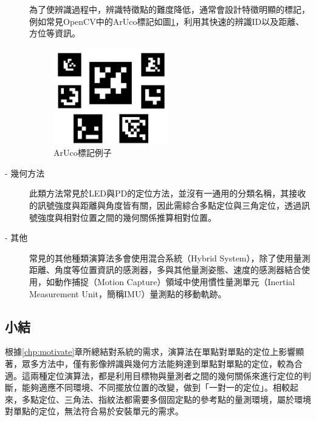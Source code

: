 \begin{description}
        \qquad
        為了使辨識過程中，辨識特徵點的難度降低，通常會設計特徵明顯的標記，例如常見OpenCV中的ArUco標記如圖\ref{pic:aruco}，利用其快速的辨識ID以及距離、方位等資訊。
        
        \begin{figure}[htpb]
            \centering
            \includegraphics[width=5cm]{ch2pic/aruco.png}
            \caption{ArUco標記例子\cite{pic:aruco}}
            \label{pic:aruco}
        \end{figure}
        
        \item[- 幾何方法] \hfill 
        
        \qquad
        此類方法常見於LED與PD的定位方法，並沒有一通用的分類名稱，其接收的訊號強度與距離與角度皆有關，因此需綜合多點定位與三角定位，透過訊號強度與相對位置之間的幾何關係推算相對位置\cite{survey_light2020}。
        
        \item[- 其他]\hfill 
        
        \qquad
        常見的其他種類演算法多會使用混合系統（Hybrid System）\cite{survey_indoor2018}，除了使用量測距離、角度等位置資訊的感測器，多與其他量測姿態、速度的感測器結合使用，如動作捕捉（Motion Capture）領域中使用慣性量測單元（Inertial Measurement Unit，簡稱IMU）量測點的移動軌跡。

    \end{description}

    \subsection{小結}

    根據\ref{chp:motivate}章所總結對系統的需求，演算法在單點對單點的定位上影響顯著，眾多方法中，僅有影像辨識與幾何方法能夠達到單點對單點的定位，較為合適。這兩種定位演算法，都是利用目標物與量測者之間的幾何關係來進行定位的判斷，能夠適應不同環境、不同擺放位置的改變，做到「一對一的定位」。相較起來，多點定位、三角法、指紋法都需要多個固定點的參考點的量測環境，屬於環境對單點的定位，無法符合易於安裝單元的需求。




